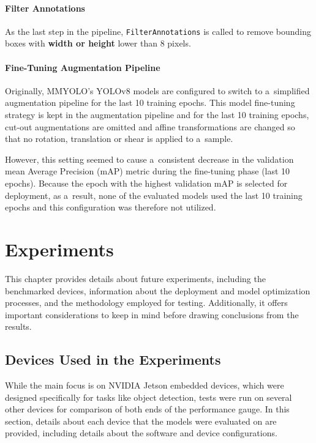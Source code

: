 \subsubsection*{Filter Annotations}

As the last step in the pipeline, \texttt{FilterAnnotations} is called to remove
bounding boxes with \textbf{width or height} lower than \num{8} pixels.


\subsubsection{Fine-Tuning Augmentation Pipeline}

Originally, MMYOLO's YOLOv8 models are configured to switch to a~simplified
augmentation pipeline for the last 10 training epochs. This model fine-tuning
strategy is kept in the augmentation pipeline and for the last 10 training
epochs, cut-out augmentations are omitted and affine transformations are changed
so that no rotation, translation or shear is applied to a~sample.

However, this setting seemed to cause a~consistent decrease in the validation
mean Average Precision (mAP) metric during the fine-tuning phase (last 10
epochs). Because the epoch with the highest validation mAP is selected for
deployment, as a~result, none of the evaluated models used the last 10 training
epochs and this configuration was therefore not utilized.




\chapter{Experiments}
\label{Experiments}

This chapter provides details about future experiments, including the
benchmarked devices, information about the deployment and model optimization
processes, and the methodology employed for testing. Additionally, it offers
important considerations to keep in mind before drawing conclusions from the
results.


\section{Devices Used in the Experiments}

While the main focus is on NVIDIA Jetson embedded devices, which were designed
specifically for tasks like object detection, tests were run on several other
devices for comparison of both ends of the performance gauge. In this section,
details about each device that the models were evaluated on are provided,
including details about the software and device configurations.


